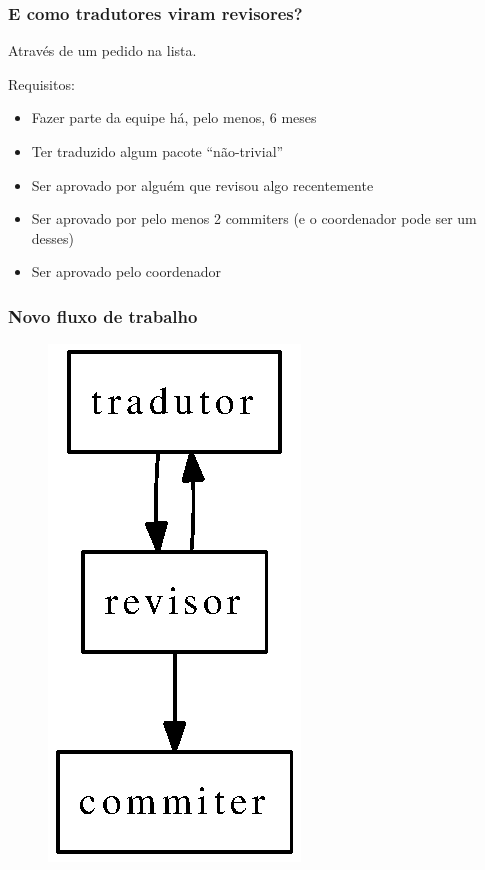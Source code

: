 \documentclass{beamer}
\begin{document}
\begin{frame}
    \frametitle{E como tradutores viram revisores?}
    Através de um pedido na lista.

    Requisitos:
    \begin{itemize}[<+->]
        \item Fazer parte da equipe há, pelo menos, 6 meses
        \item Ter traduzido algum pacote ``não-trivial''
        \item Ser aprovado por alguém que revisou algo recentemente
        \item Ser aprovado por pelo menos 2 commiters (e o coordenador pode ser um desses)
        \item Ser aprovado pelo coordenador
    \end{itemize}
\end{frame}



\begin{frame}
    \frametitle{Novo fluxo de trabalho}
    \begin{figure}[ht]
        \includegraphics{fluxo_novo.eps}     
    \end{figure}
\end{frame}
\end{document}
